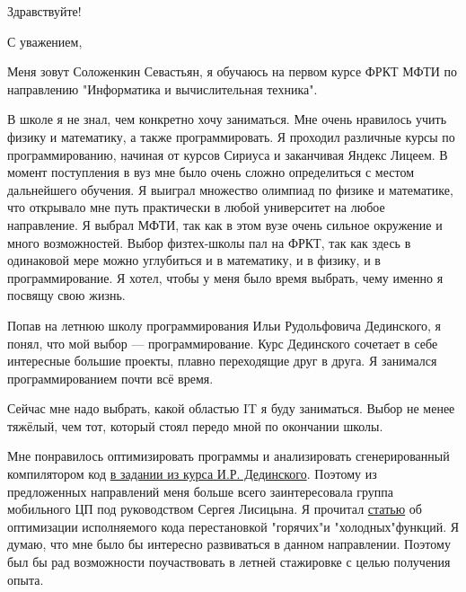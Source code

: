 \documentclass[11pt,a4paper,roman]{moderncv}
\date{}
\begin{document}
\opening{Здравствуйте!}
\closing{С уважением, }

\makelettertitle
\hspace{0.5cm}
Меня зовут Соложенкин Севастьян, я обучаюсь на первом курсе ФРКТ МФТИ по направлению "Информатика и вычислительная техника".

\hspace{0.5cm}
В школе я не знал, чем конкретно хочу заниматься. Мне очень нравилось учить физику и математику, а также программировать.
Я проходил различные курсы по программированию, начиная от курсов Сириуса и заканчивая Яндекс Лицеем.
В момент поступления в вуз мне было очень сложно определиться с местом дальнейшего обучения.
Я выиграл множество олимпиад по физике и математике, что открывало мне путь практически в любой университет на любое направление.
Я выбрал МФТИ, так как в этом вузе очень сильное окружение и много возможностей.
Выбор физтех-школы пал на ФРКТ, так как здесь в одинаковой мере можно углубиться и в математику, и в физику, и в программирование.
Я хотел, чтобы у меня было время выбрать, чему именно я посвящу свою жизнь.

\hspace{0.5cm}
Попав на летнюю школу программирования Ильи Рудольфовича Дединского, я понял, что мой выбор — программирование.
Курс Дединского сочетает в себе интересные большие проекты, плавно переходящие друг в друга.
Я занимался программированием почти всё время.

\hspace{0.5cm}
Сейчас мне надо выбрать, какой областью IT я буду заниматься.
Выбор не менее тяжёлый, чем тот, который стоял передо мной по окончании школы.

\hspace{0.5cm}
Мне понравилось оптимизировать программы и анализировать сгенерированный компилятором код \href{https://github.com/sevaphasol/mandelbrot}{в задании из курса И.Р. Дединского}.
Поэтому из предложенных направлений меня больше всего заинтересовала группа мобильного ЦП под руководством Сергея Лисицына. Я прочитал \href{https://cyberleninka.ru/article/n/sbor-profilnoy-informatsii-s-pomoschyu-trass-ispolneniya-prilozheniya-dlya-staticheskoy-optimiziruyuschey-binarnoy-translyatsii/viewer}{статью} об оптимизации исполняемого кода перестановкой "горячих"и "холодных"функций. Я думаю, что мне было бы интересно развиваться в данном направлении. Поэтому был бы рад возможности поучаствовать в летней стажировке с целью получения опыта.

\makeletterclosing
\end{document}
